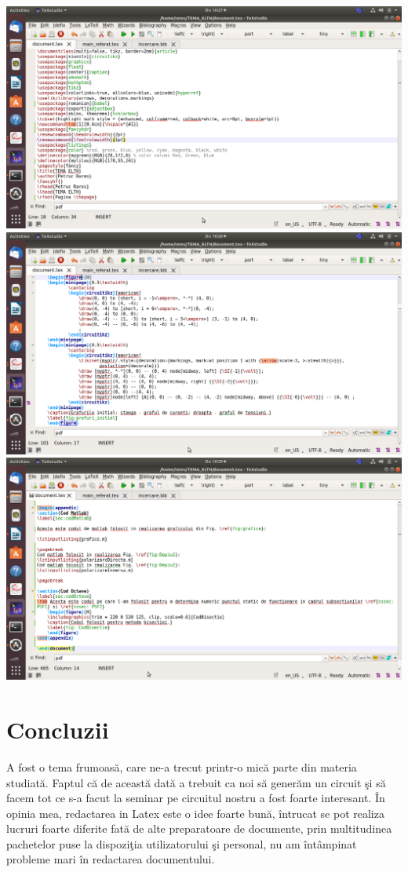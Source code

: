 \documentclass[multi=false, tikz, border=2mm]{article}
\newcommand\tab[1][0.6cm]{\hspace*{#1}}
\begin{document}
	\hspace{-0.5cm}\includegraphics[max width=1.2\textwidth]{PreambulCod}
	\includegraphics[max width=1.2\textwidth]{COD_Grafuri_intiale}
	\includegraphics[max width=1.2\textwidth]{COD_FINAL}
\section{Concluzii}
	\tab A fost o tema frumoas\u{a}, care ne-a trecut printr-o mic\u{a} parte din materia studiat\u{a}. Faptul c\u{a} de aceast\u{a} dat\u{a} a trebuit ca noi s\u{a} gener\u{a}m un circuit \c{s}i s\u{a} facem tot ce s-a facut la seminar pe circuitul nostru a fost foarte interesant. \^{I}n opinia mea, redactarea in Latex este o idee foarte bun\u{a}, \^{i}ntrucat se pot realiza lucruri foarte diferite fat\u{a} de alte preparatoare de documente, prin multitudinea pachetelor puse la dispozi\c{t}ia utilizatorului \c{s}i personal, nu am \^{i}nt\^{a}mpinat probleme mari \^{i}n redactarea documentului.
\pagebreak
\end{document}
